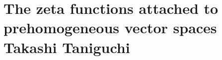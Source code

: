 \chapter{The zeta functions attached to prehomogeneous vector spaces \\ Takashi Taniguchi}\label{ch:14}